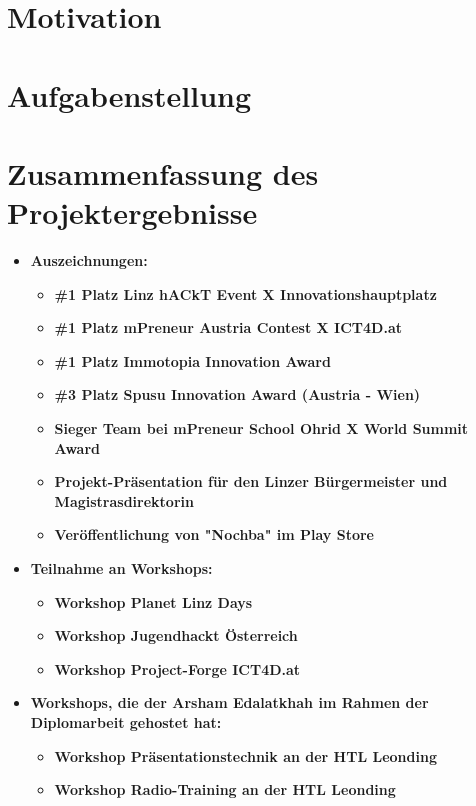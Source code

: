 
\section{Motivation}
\section{Aufgabenstellung}
\section{Zusammenfassung des Projektergebnisse}

\begin{itemize}
    \item \textbf{Auszeichnungen:}
    \begin{itemize}
        \item \textbf{\#1 Platz Linz hACkT Event X Innovationshauptplatz}
        \item \textbf{\#1 Platz mPreneur Austria Contest X ICT4D.at}
        \item \textbf{\#1 Platz Immotopia Innovation Award}
        \item \textbf{\#3 Platz Spusu Innovation Award (Austria - Wien)}
        \item \textbf{Sieger Team bei mPreneur School Ohrid X World Summit Award}
        \item \textbf{Projekt-Präsentation für den Linzer Bürgermeister und Magistrasdirektorin}
        \item \textbf{Veröffentlichung von "Nochba" im Play Store}
    \end{itemize}
    \item \textbf{Teilnahme an Workshops:}
    \begin{itemize}
        \item \textbf{Workshop Planet Linz Days}
        \item \textbf{Workshop Jugendhackt Österreich}
        \item \textbf{Workshop Project-Forge ICT4D.at}
    \end{itemize}
    \item \textbf{Workshops, die der Arsham Edalatkhah im Rahmen der Diplomarbeit gehostet hat:}
    \begin{itemize}
        \item \textbf{Workshop Präsentationstechnik an der HTL Leonding}
        \item \textbf{Workshop Radio-Training an der HTL Leonding}

\end{itemize}
\end{itemize}
